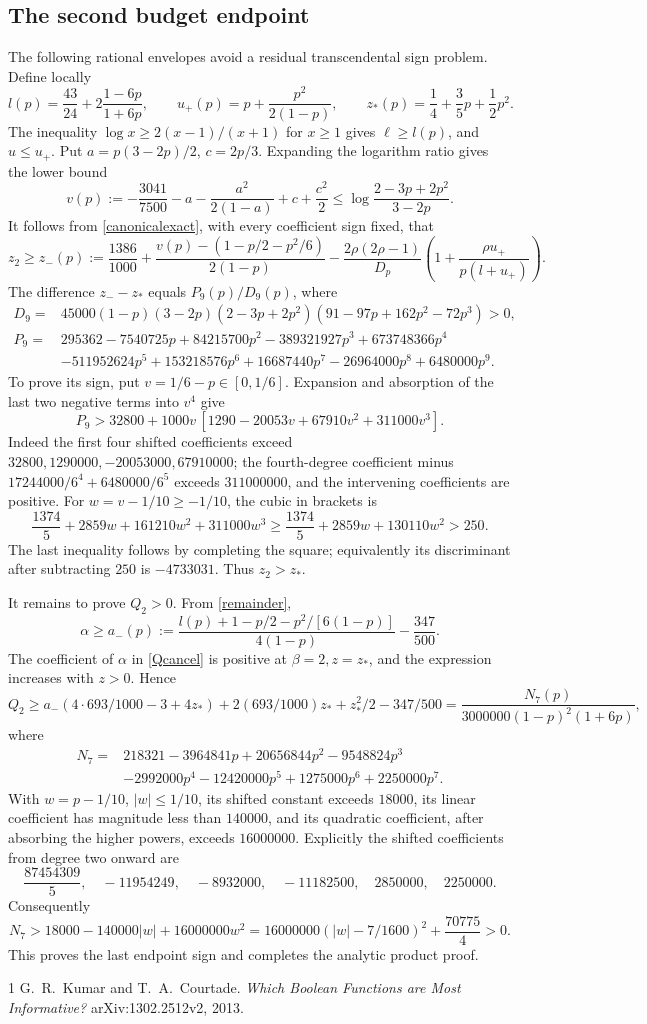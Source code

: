 \documentclass[11pt]{article}
\numberwithin{equation}{section}
\begin{document}
\subsection*{The second budget endpoint}
The following rational envelopes avoid a residual transcendental sign problem. Define locally
\[
 l(p)=\frac{43}{24}+2\frac{1-6p}{1+6p},\qquad
 u_+(p)=p+\frac{p^2}{2(1-p)},\qquad z_*(p)=\frac14+\frac35p+\frac12p^2.
\]
The inequality $\log x\ge2(x-1)/(x+1)$ for $x\ge1$ gives $\ell\ge l(p)$, and $u\le u_+$. Put $a=p(3-2p)/2$, $c=2p/3$. Expanding the logarithm ratio gives the lower bound
\[
 v(p):=-\frac{3041}{7500}-a-\frac{a^2}{2(1-a)}+c+\frac{c^2}{2}
 \le\log\frac{2-3p+2p^2}{3-2p}.
\]
It follows from \eqref{canonicalexact}, with every coefficient sign fixed, that
\[
 z_2\ge z_-(p):=
 \frac{1386}{1000}+\frac{v(p)-(1-p/2-p^2/6)}{2(1-p)}
 -\frac{2\rho(2\rho-1)}{D_p}
       \left(1+\frac{\rho u_+}{p(l+u_+)}\right).
\]
The difference $z_--z_*$ equals $P_9(p)/D_9(p)$, where
\begin{align*}
 D_9={}&45000(1-p)(3-2p)(2-3p+2p^2)(91-97p+162p^2-72p^3)>0,\\
 P_9={}&295362-7540725p+84215700p^2-389321927p^3+673748366p^4\\
 &-511952624p^5+153218576p^6+16687440p^7-26964000p^8+6480000p^9.
\end{align*}
To prove its sign, put $v=1/6-p\in[0,1/6]$. Expansion and absorption of the last two negative terms into $v^4$ give
\[
 P_9>32800+1000v\,[1290-20053v+67910v^2+311000v^3].
\]
Indeed the first four shifted coefficients exceed $32800,1290000,-20053000,67910000$; the fourth-degree coefficient minus $17244000/6^4+6480000/6^5$ exceeds $311000000$, and the intervening coefficients are positive. For $w=v-1/10\ge-1/10$, the cubic in brackets is
\[
 \frac{1374}{5}+2859w+161210w^2+311000w^3
 \ge\frac{1374}{5}+2859w+130110w^2>250.
\]
The last inequality follows by completing the square; equivalently its discriminant after subtracting $250$ is $-4733031$. Thus $z_2>z_*$.

It remains to prove $Q_2>0$. From \eqref{remainder},
\[
 \alpha\ge a_-(p):=
 \frac{l(p)+1-p/2-p^2/[6(1-p)]}{4(1-p)}-\frac{347}{500}.
\]
The coefficient of $\alpha$ in \eqref{Qcancel} is positive at $\beta=2,z=z_*$, and the expression increases with $z>0$. Hence
\[
 Q_2\ge a_-(4\cdot693/1000-3+4z_*)
       +2(693/1000)z_*+z_*^2/2-347/500
       =\frac{N_7(p)}{3000000(1-p)^2(1+6p)},
\]
where
\begin{align*}
 N_7={}&218321-3964841p+20656844p^2-9548824p^3\\
 &-2992000p^4-12420000p^5+1275000p^6+2250000p^7.
\end{align*}
With $w=p-1/10$, $|w|\le1/10$, its shifted constant exceeds $18000$, its linear coefficient has magnitude less than $140000$, and its quadratic coefficient, after absorbing the higher powers, exceeds $16000000$. Explicitly the shifted coefficients from degree two onward are
\[
 \frac{87454309}{5},\quad-11954249,\quad-8932000,\quad-11182500,
 \quad2850000,\quad2250000.
\]
Consequently
\[
 N_7>18000-140000|w|+16000000w^2
 =16000000(|w|-7/1600)^2+\frac{70775}{4}>0.
\]
This proves the last endpoint sign and completes the analytic product proof.

\begin{thebibliography}{1}
 G.~R.~Kumar and T.~A.~Courtade.
\emph{Which Boolean Functions are Most Informative?}
arXiv:1302.2512v2, 2013.
\end{thebibliography}
\end{document}

